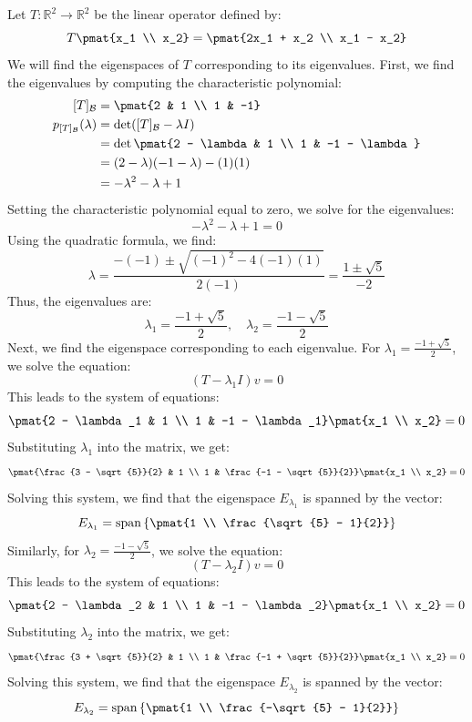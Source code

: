 \documentclass[openany]{book}
\begin{document}
\begin{example}
    Let $T: \mathbb{R}^2 \to \mathbb{R}^2$ be the linear operator defined by:
    $$T\pmat{x_1 \\ x_2} = \pmat{2x_1 + x_2 \\ x_1 - x_2}$$
    We will find the eigenspaces of $T$ corresponding to its eigenvalues. First, we find the eigenvalues by computing the characteristic polynomial:
    \[
    \begin{aligned}
    [T]_{\mathcal{B}} &= \pmat{2 & 1 \\ 1 & -1} \\
    p_{[T]_{\mathcal{B}}}(\lambda) &= \det([T]_{\mathcal{B}} - \lambda I) \\
    &= \det\pmat{2 - \lambda & 1 \\ 1 & -1 - \lambda} \\
    &= (2 - \lambda)(-1 - \lambda) - (1)(1) \\
    &= -\lambda^2 - \lambda + 1
    \end{aligned}
    \]
    Setting the characteristic polynomial equal to zero, we solve for the eigenvalues:
    $$-\lambda^2 - \lambda + 1 = 0$$
    Using the quadratic formula, we find:
    $$\lambda = \frac{-(-1) \pm \sqrt{(-1)^2 - 4(-1)(1)}}{2(-1)} = \frac{1 \pm \sqrt{5}}{-2}$$
    Thus, the eigenvalues are:
    $$\lambda_1 = \frac{-1 + \sqrt{5}}{2}, \quad \lambda_2 = \frac{-1 - \sqrt{5}}{2}$$
    Next, we find the eigenspace corresponding to each eigenvalue. 
    For $\lambda_1 = \frac{-1 + \sqrt{5}}{2}$, we solve the equation:
    $$(T - \lambda_1 I)v = 0$$
    This leads to the system of equations:
    $$\pmat{2 - \lambda_1 & 1 \\ 1 & -1 - \lambda_1}\pmat{x_1 \\ x_2} = 0$$
    Substituting $\lambda_1$ into the matrix, we get:
    $$\pmat{\frac{3 - \sqrt{5}}{2} & 1 \\ 1 & \frac{-1 - \sqrt{5}}{2}}\pmat{x_1 \\ x_2} = 0$$
    Solving this system, we find that the eigenspace $E_{\lambda_1}$ is spanned by the vector:
    $$E_{\lambda_1} = \text{span}\left\{\pmat{1 \\ \frac{\sqrt{5} - 1}{2}}\right\}$$
    Similarly, for $\lambda_2 = \frac{-1 - \sqrt{5}}{2}$, we solve the equation:
    $$(T - \lambda_2 I)v = 0$$
    This leads to the system of equations:
    $$\pmat{2 - \lambda_2 & 1 \\ 1 & -1 - \lambda_2}\pmat{x_1 \\ x_2} = 0$$
    Substituting $\lambda_2$ into the matrix, we get:
    $$\pmat{\frac{3 + \sqrt{5}}{2} & 1 \\ 1 & \frac{-1 + \sqrt{5}}{2}}\pmat{x_1 \\ x_2} = 0$$
    Solving this system, we find that the eigenspace $E_{\lambda_2}$ is spanned by the vector:
    $$E_{\lambda_2} = \text{span}\left\{\pmat{1 \\ \frac{-\sqrt{5} - 1}{2}}\right\}$$
\end{example}
\end{document}
